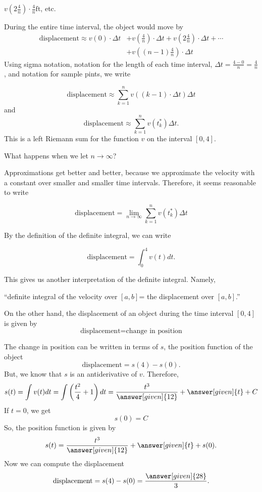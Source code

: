 \documentclass{ximera}
\begin{document}
\begin{example}
\begin{explanation}
 $v\left(2\frac{4}{n}\right)\cdot\frac{4}{n} \mathrm{ft}$, etc. 
 
 During the entire time interval, the object would move by
\begin{align*}
   \text{displacement} \approx v(0)\cdot\Delta
   t &+v\left(\frac{4}{n}\right)\cdot\Delta
   t+v\left(2\frac{4}{n}\right)\cdot\Delta
   t+\cdots\\
   &+v\left((n-1)\frac{4}{n}\right)\cdot\Delta
   t
\end{align*}
Using sigma notation, notation for the length of each time interval,
$\Delta t=\frac{4-0}{n}=\frac{4}{n}$, and notation for sample pints,
we write

  \[
   \text{displacement}\approx \sum_{k=1}^nv((k-1)\cdot\Delta t)\Delta t
\]
and
\[
   \text{displacement}\approx \sum_{k=1}^nv(t_{k}^*)\Delta t.
  \]
  This is a left Riemann sum for the function $v$ on the interval $[0,4]$.
  
  
What happens when we let $n\to\infty$?

Approximations get better and better, because we approximate the
velocity with a constant over smaller and smaller time intervals.
Therefore, it seems reasonable to write

  \[
   \text{displacement}=\lim_{n\to\infty}\sum_{k=1}^nv(t_k^*)\Delta t
\]

By  the definition of the definite integral, we can write


  \[
   \text{displacement}=\int_{0}^{4}v(t) dt.
\]

This gives us another interpretation of the definite integral. Namely,



``definite integral of the velocity over $[a,b]$= the displacement over $[a,b]$.''



  On the other hand, the displacement of an object during the time interval $[0,4]$ is given by
  \[
   \text{displacement}=\text{change in position}
\]
  
  The change in position can be written in terms of $s$, the position function of the object
  \[
   \text{displacement}=s(4)-s(0).
\]
But, we know that $s$ is an antiderivative of $v$. Therefore,
 \[
  s(t)=\int v(t) dt=\int\left(\frac{t^2}{4}+1\right) dt=\frac{t^3}{\answer[given]{12}}+\answer[given]{t}+C
\]
If $t=0$, we get
 \[
  s(0)=C
\]
So, the position function is given by
\[
  s(t)=\frac{t^3}{\answer[given]{12}}+\answer[given]{t}+s(0).
\]
Now we can compute the displacement
 \[
   \text{displacement}=s(4)-s(0)=\frac{\answer[given]{28}}{3}.
\]
  \end{explanation}
  

\end{example}
\end{document}
